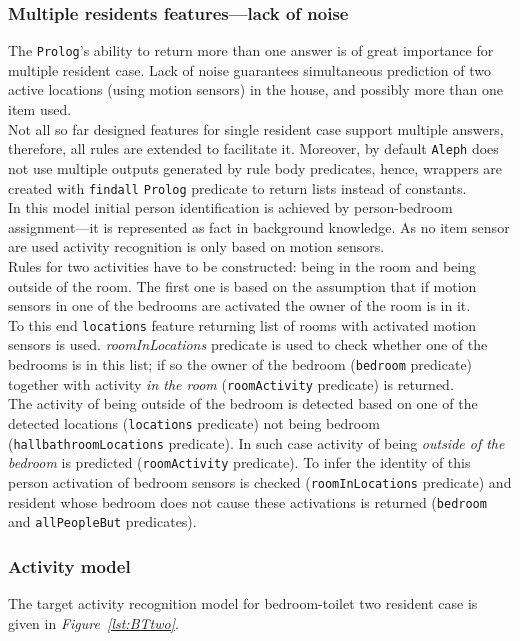 \documentclass[10pt, a4paper, pdflatex, leqno, twoside, openright]{report}
\begin{document}
      \subsubsection{Multiple residents features---lack of noise}
The \texttt{Prolog}'s ability to return more than one answer is of great importance for multiple resident case. Lack of noise guarantees simultaneous prediction of two active locations (using motion sensors) in the house, and possibly more than one item used.\\
Not all so far designed features for single resident case support multiple answers, therefore, all rules are extended to facilitate it. Moreover, by default \texttt{Aleph} does not use multiple outputs generated by rule body predicates, hence, wrappers are created with \texttt{findall} \texttt{Prolog} predicate to return lists instead of constants.\\

In this model initial person identification is achieved by person-bedroom assignment---it is represented as fact in background knowledge. As no item sensor are used activity recognition is only based on motion sensors.\\

Rules for two activities have to be constructed: being in the room and being outside of the room. The first one is based on the assumption that if motion sensors in one of the bedrooms are activated the owner of the room is in it.\\
To this end \texttt{locations} feature returning list of rooms with activated motion sensors is used. \emph{roomInLocations} predicate is used to check whether one of the bedrooms is in this list; if so the owner of the bedroom (\texttt{bedroom} predicate) together with activity \emph{in the room} (\texttt{roomActivity} predicate) is returned.\\

The activity of being outside of the bedroom is detected based on one of the detected locations (\texttt{locations} predicate) not being bedroom (\texttt{hallbathroomLocations} predicate). In such case activity of being \emph{outside of the bedroom} is predicted (\texttt{roomActivity} predicate). To infer the identity of this person activation of bedroom sensors is checked (\texttt{roomInLocations} predicate) and resident whose bedroom does not cause these activations is returned (\texttt{bedroom} and \texttt{allPeopleBut} predicates).

      \subsubsection{Activity model}
The target activity recognition model for bedroom-toilet two resident case is given in \emph{Figure~\ref{lst:BTtwo}}.\\
\end{document}
